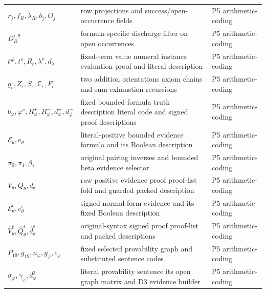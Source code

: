 \begin{longtable}{@{}p{}p{}p{}@{}}
\(r_j,\allowbreak f_R,\allowbreak \lambda_R,\allowbreak b_j,\allowbreak O_j\) & row projections and success/open-occurrence fields & P5 arithmetic-\allowbreak{}coding \\
\(D_R^{i,\theta}\) & formula-specific discharge filter on open occurrences & P5 arithmetic-\allowbreak{}coding \\
\(t^\#,\allowbreak t^\nu,\allowbreak R_t,\allowbreak \lambda^\nu,\allowbreak d_\lambda\) & fixed-term value numeral instance evaluation proof and literal description & P5 arithmetic-\allowbreak{}coding \\
\(g_\epsilon,\allowbreak Z_\epsilon,\allowbreak S_\epsilon,\allowbreak \mathsf C_\epsilon,\allowbreak F_\epsilon\) & two addition orientations axiom chains and sum-exhaustion recursions & P5 arithmetic-\allowbreak{}coding \\
\(b_\varphi,\allowbreak \varphi^\nu,\allowbreak R_\varphi^+,\allowbreak R_\varphi^-,\allowbreak d_\varphi^+,\allowbreak d_\varphi^-\) & fixed bounded-formula truth description literal code and signed proof descriptions & P5 arithmetic-\allowbreak{}coding \\
\(\mathcal E_\theta,\allowbreak e_\theta\) & literal-positive bounded evidence formula and its Boolean description & P5 arithmetic-\allowbreak{}coding \\
\(\pi_0,\allowbreak \pi_1,\allowbreak \beta_*\) & original pairing inverses and bounded beta evidence selector & P5 arithmetic-\allowbreak{}coding \\
\(V_\theta,\allowbreak Q_\theta,\allowbreak d_\theta\) & raw positive evidence proof proof-list fold and guarded packed description & P5 arithmetic-\allowbreak{}coding \\
\(\mathcal E_\theta^\epsilon,\allowbreak e_\theta^\epsilon\) & signed-normal-form evidence and its fixed Boolean description & P5 arithmetic-\allowbreak{}coding \\
\(\widehat V_\theta^\epsilon,\allowbreak \widehat Q_\theta^\epsilon,\allowbreak \widehat d_\theta^\epsilon\) & original-syntax signed proof proof-list and packed descriptions & P5 arithmetic-\allowbreak{}coding \\
\(P_{19},\allowbreak g_{19},\allowbreak n_\varphi,\allowbreak g_\varphi,\allowbreak c_\varphi\) & fixed selected provability graph and substituted sentence codes & P5 arithmetic-\allowbreak{}coding \\
\(\sigma_\varphi,\allowbreak \gamma_\varphi,\allowbreak d^3_\varphi\) & literal provability sentence its open graph matrix and D3 evidence builder & P5 arithmetic-\allowbreak{}coding \\

\end{longtable}
